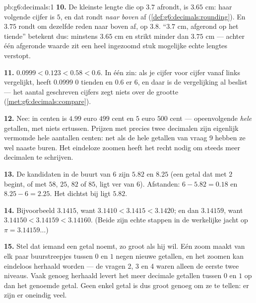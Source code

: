 \begin{solution}{pb:g6:decimals:1}
\textbf{10.} De kleinste lengte die op $3.7$ afrondt, is $3.65$ cm: haar
volgende cijfer is $5$, en dat rondt \emph{naar boven} af
(\cref{def:g6:decimals:rounding}). En $3.75$ rondt om dezelfde reden naar boven
af, op $3.8$. ``$3.7$ cm, afgerond op het tiende'' betekent dus: minstens
$3.65$ cm en strikt minder dan $3.75$ cm --- achter één afgeronde waarde zit
een heel ingezoomd stuk mogelijke echte lengtes verstopt.

\textbf{11.} $0.0999 < 0.123 < 0.58 < 0.6$. In één zin: als je cijfer voor
cijfer vanaf links vergelijkt, heeft $0.0999$ $0$ tienden en $0.6$ er $6$, en
daar is de vergelijking al beslist --- het aantal geschreven cijfers zegt niets
over de grootte (\cref{met:g6:decimals:compare}).

\textbf{12.} Nee: in centen is $4.99$ euro $499$ cent en $5$ euro $500$ cent
--- opeenvolgende \emph{hele} getallen, met niets ertussen. Prijzen met precies
twee decimalen zijn eigenlijk vermomde hele aantallen centen: net als de hele
getallen van vraag 9 hebben ze wel naaste buren. Het eindeloze zoomen heeft het
recht nodig om steeds meer decimalen te schrijven.

\textbf{13.} De kandidaten in de buurt van $6$ zijn $5.82$ en $8.25$ (een getal
dat met $2$ begint, of met $58$, $25$, $82$ of $85$, ligt ver van $6$).
Afstanden: $6 - 5.82 = 0.18$ en $8.25 - 6 = 2.25$. Het dichtst bij ligt
$5.82$.

\textbf{14.} Bijvoorbeeld $3.1415$, want $3.1410 < 3.1415 < 3.1420$; en dan
$3.14159$, want $3.14150 < 3.14159 < 3.14160$. (Beide zijn echte stappen in de
werkelijke jacht op $\pi = 3.14159\dots$)

\textbf{15.} Stel dat iemand een getal noemt, zo groot als hij wil. Eén zoom
maakt van elk paar buurstreepjes tussen $0$ en $1$ negen nieuwe getallen, en
het zoomen kan eindeloos herhaald worden --- de vragen 2, 3 en 4 waren alleen
de eerste twee niveaus. Vaak genoeg herhaald levert het meer decimale getallen
tussen $0$ en $1$ op dan het genoemde getal. Geen enkel getal is dus groot
genoeg om ze te tellen: er zijn er oneindig veel.
\end{solution}
